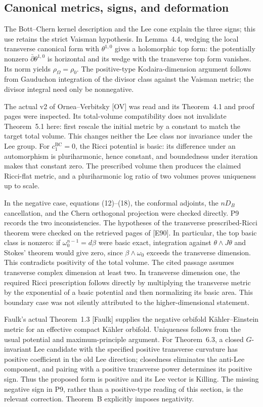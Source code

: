 \documentclass[10pt]{article}
\begin{document}
\subsection*{Canonical metrics, signs, and deformation}
The Bott–Chern kernel description and the Lee cone explain the three signs; this use retains the strict Vaisman hypothesis. In Lemma 4.4, wedging the local transverse canonical form with \(\theta^{1,0}\) gives a holomorphic top form: the potentially nonzero \(\bar\partial\theta^{1,0}\) is horizontal and its wedge with the transverse top form vanishes. Its norm yields \(\rho_\Omega=\rho_0\). The positive-type Kodaira-dimension argument follows from Gauduchon integration of the divisor class against the Vaisman metric; the divisor integral need only be nonnegative.\par
The actual v2 of Ornea–Verbitsky [OV] was read and its Theorem 4.1 and proof pages were inspected. Its total-volume compatibility does not invalidate Theorem 5.1 here: first rescale the initial metric by a constant to match the target total volume. This changes neither the Lee class nor invariance under the Lee group. For \(c_1^{\mathrm{BC}}=0\), the Ricci potential is basic: its difference under an automorphism is pluriharmonic, hence constant, and boundedness under iteration makes that constant zero. The prescribed volume then produces the claimed Ricci-flat metric, and a pluriharmonic log ratio of two volumes proves uniqueness up to scale.\par
In the negative case, equations (12)–(18), the conformal adjoints, the \(nD_B\) cancellation, and the Chern orthogonal projection were checked directly. P9 records the two inconsistencies. The hypotheses of the transverse prescribed-Ricci theorem were checked on the retrieved pages of [E90]. In particular, the top basic class is nonzero: if \(\omega_0^{n-1}=d\beta\) were basic exact, integration against \(\theta\wedge J\theta\) and Stokes’ theorem would give zero, since \(\beta\wedge\omega_0\) exceeds the transverse dimension. This contradicts positivity of the total volume. The cited passage assumes transverse complex dimension at least two. In transverse dimension one, the required Ricci prescription follows directly by multiplying the transverse metric by the exponential of a basic potential and then normalizing its basic area. This boundary case was not silently attributed to the higher-dimensional statement.\par
Faulk’s actual Theorem 1.3 [Faulk] supplies the negative orbifold Kähler–Einstein metric for an effective compact Kähler orbifold. Uniqueness follows from the usual potential and maximum-principle argument. For Theorem 6.3, a closed \(G\)-invariant Lee candidate with the specified positive transverse curvature has positive coefficient in the old Lee direction; closedness eliminates the anti-Lee component, and pairing with a positive transverse power determines its positive sign. Thus the proposed form is positive and its Lee vector is Killing. The missing negative sign in P9, rather than a positive-type reading of this section, is the relevant correction. Theorem B explicitly imposes negativity.\par
\end{document}
